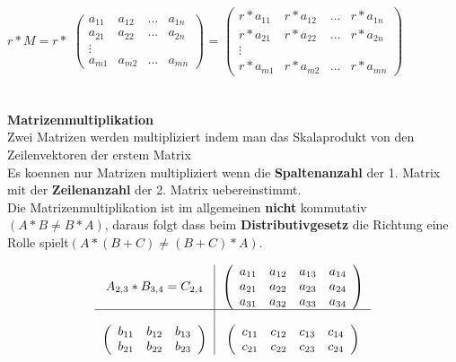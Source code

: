 \documentclass[a4paper]{article} %
\begin{document}
		$r * M = r * $
		$
		\begin{pmatrix}
		a_{11} & a_{12} & ... 	& a_{1n}\\
		a_{21} & a_{22} & ...	& a_{2n}\\
		\vdots &        &	    &\\
		a_{m1} & a_{m2} & ...	& a_{mn}
		\end{pmatrix}
		$
		=
		$
		\begin{pmatrix}
		r*a_{11} & r*a_{12} & ... 	& r*a_{1n}\\
		r*a_{21} & r*a_{22} & ...	& r*a_{2n}\\
		\vdots &        &	    &\\
		r*a_{m1} & r*a_{m2} & ...	& r*a_{mn}
		\end{pmatrix}
		$
		\\\\\\
		\textbf{Matrizenmultiplikation}\\
		Zwei Matrizen werden multipliziert indem man das Skalaprodukt von den Zeilenvektoren der erstem Matrix\\
		Es koennen nur Matrizen multipliziert wenn die \textbf{Spaltenanzahl} der 1. Matrix mit der \textbf{Zeilenanzahl} der 2. Matrix uebereinstimmt.\\
		Die Matrizenmultiplikation ist im allgemeinen\textbf{ nicht} kommutativ$(A*B\neq B*A)$, daraus folgt dass beim \textbf{Distributivgesetz} die Richtung eine Rolle spielt$(A*(B+C)\neq (B+C)*A)$.

		\begin{align*}
			\begin{tabular}{c|c}
		$A_{2,3}*B_{3,4} = C_{2,4}$  &
		$\left(\begin{array}{cccc}
			a_{11} 	&  a_{12}  &	a_{13} 	&	 a_{14}  \\
			a_{21}  &  a_{22}  &	a_{23} 	&	 a_{24}  \\
			a_{31}  &  a_{32}  &	a_{33}  &	 a_{34}  \\
		\end{array}\right)$ \\
		\hline \\
		$
		\left(\begin{array}{ccc}
		 b_{11} 	&  b_{12} &	b_{13}\\
		 b_{21} 	&  b_{22} &	b_{23}\\
		\end{array}\right)
		$ &
		$\left(\begin{array}{cccc}
			c_{11} 	& c_{12} &	c_{13}	&	c_{14} \\
			c_{21} 	&  c_{22} &	c_{23}	&	 c_{24} \\
		\end{array}\right)$ \\
		\end{tabular}
		\end{align*}
\end{document}
